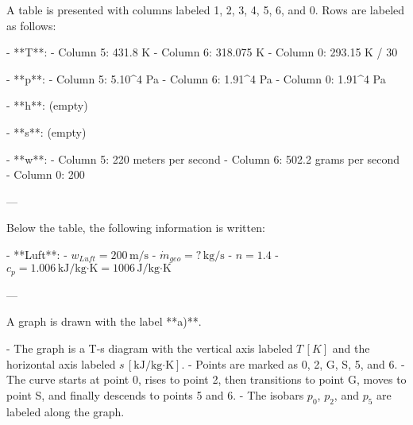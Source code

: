 A table is presented with columns labeled 1, 2, 3, 4, 5, 6, and 0. Rows are labeled as follows:  

- **T**:  
  - Column 5: 431.8 K  
  - Column 6: 318.075 K  
  - Column 0: 293.15 K / 30  

- **p**:  
  - Column 5: 5.10^4 Pa  
  - Column 6: 1.91^4 Pa  
  - Column 0: 1.91^4 Pa  

- **h**: (empty)  

- **s**: (empty)  

- **w**:  
  - Column 5: 220 meters per second  
  - Column 6: 502.2 grams per second  
  - Column 0: 200  

---

Below the table, the following information is written:  

- **Luft**:  
  - \( w_{Luft} = 200 \, \text{m/s} \)  
  - \( \dot{m}_{geo} = ? \, \text{kg/s} \)  
  - \( n = 1.4 \)  
  - \( c_p = 1.006 \, \text{kJ/kg·K} = 1006 \, \text{J/kg·K} \)  

---

A graph is drawn with the label **a)**.  

- The graph is a T-s diagram with the vertical axis labeled \( T \, [K] \) and the horizontal axis labeled \( s \, [\text{kJ/kg·K}] \).  
- Points are marked as 0, 2, G, S, 5, and 6.  
- The curve starts at point 0, rises to point 2, then transitions to point G, moves to point S, and finally descends to points 5 and 6.  
- The isobars \( p_0 \), \( p_2 \), and \( p_5 \) are labeled along the graph.